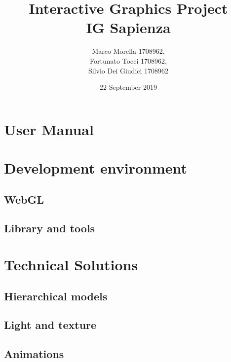 \documentclass[a4paper, 11pt]{article}
\title { Interactive Graphics Project\\ \bigskip \large IG Sapienza}
\date{22 September 2019}
\author{Marco Morella 1708962, \\Fortunato Tocci 1708962, \\Silvio Dei Giudici 1708962}
\begin{document}
\maketitle

\section{User Manual}

\section{Development environment}
\subsection{WebGL}
\subsection{Library and tools}

\section{Technical Solutions}
\subsection{Hierarchical models}
\subsection{Light and texture}
\subsection{Animations}
\end{document}
